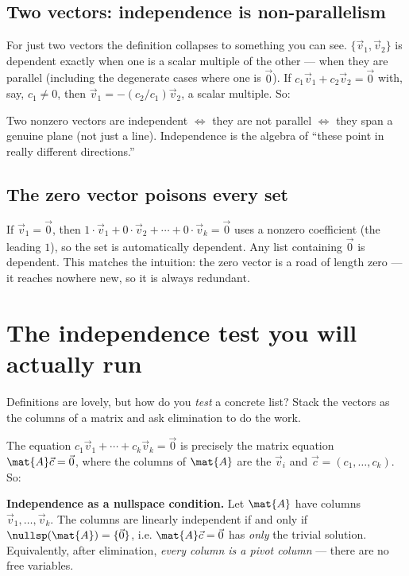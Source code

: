 \subsection*{Two vectors: independence is non-parallelism}

For just two vectors the definition collapses to something you can see.
$\{\vec{v}_1, \vec{v}_2\}$ is dependent exactly when one is a scalar multiple of
the other --- when they are parallel (including the degenerate cases where one is
$\vec{0}$). If $c_1\vec{v}_1 + c_2\vec{v}_2 = \vec{0}$ with, say, $c_1 \ne 0$,
then $\vec{v}_1 = -(c_2/c_1)\vec{v}_2$, a scalar multiple. So:

\begin{focusbox}
Two nonzero vectors are independent $\iff$ they are not parallel $\iff$ they span
a genuine plane (not just a line). Independence is the algebra of ``these point
in really different directions.''
\end{focusbox}

\subsection*{The zero vector poisons every set}

If $\vec{v}_1 = \vec{0}$, then $1\cdot\vec{v}_1 + 0\cdot\vec{v}_2 + \cdots +
0\cdot\vec{v}_k = \vec{0}$ uses a nonzero coefficient (the leading $1$), so the
set is automatically dependent. Any list containing $\vec{0}$ is dependent. This
matches the intuition: the zero vector is a road of length zero --- it reaches
nowhere new, so it is always redundant.

\section{The independence test you will actually run}
\label{ch14:test}

Definitions are lovely, but how do you \emph{test} a concrete list? Stack the
vectors as the columns of a matrix and ask elimination to do the work.

The equation $c_1\vec{v}_1 + \cdots + c_k\vec{v}_k = \vec{0}$ is precisely the
matrix equation $\mat{A}\vec{c} = \vec{0}$, where the columns of $\mat{A}$ are the
$\vec{v}_i$ and $\vec{c} = (c_1,\dots,c_k)$. So:

\begin{formalbox}
\textbf{Independence as a nullspace condition.} Let $\mat{A}$ have columns
$\vec{v}_1,\dots,\vec{v}_k$. The columns are linearly independent if and only if
$\nullsp(\mat{A}) = \{\vec{0}\}$, i.e. $\mat{A}\vec{c}=\vec{0}$ has \emph{only}
the trivial solution. Equivalently, after elimination, \emph{every column is a
pivot column} --- there are no free variables.
\end{formalbox}


